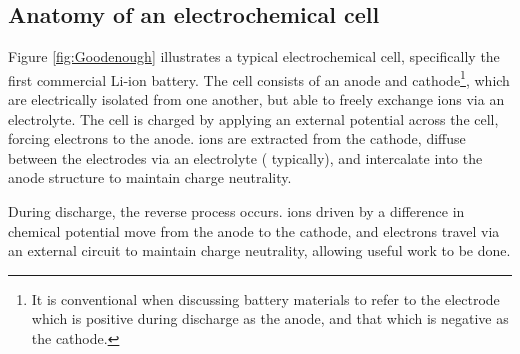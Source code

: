 \subsection{Anatomy of an electrochemical cell}
Figure \ref{fig:Goodenough} illustrates a typical electrochemical cell, specifically the first commercial Li-ion battery.
The cell consists of an anode and cathode\footnote{It is conventional when discussing battery materials to refer to the electrode which is positive during discharge as the anode, and that which is negative as the cathode.},
which are electrically isolated from one another, but able to freely exchange ions via an electrolyte.
The cell is charged by applying an external potential across the cell, forcing electrons to the anode.
 ions are extracted from the  cathode, diffuse between the electrodes via an electrolyte ( typically), and intercalate into the anode structure to maintain charge neutrality.

During discharge, the reverse process occurs.
 ions driven by a difference in chemical potential move from the anode to the cathode, and electrons travel via an external circuit to maintain charge neutrality, allowing useful work to be done.


